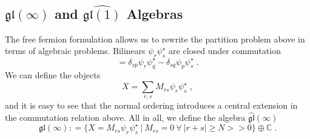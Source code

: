 

\subsection{\(\mathfrak{gl}(\infty)\) and \(\widehat{\mathfrak{gl}(1)}\) Algebras}

The free fermion formulation allows us to rewrite the partition
problem above in terms of algebraic problems. Bilinears
\(\psi_r\psi_s^\star\) are closed under commutation
\begin{equation}
[\psi_r\psi_s^\star, \psi_p\psi_q^\star]= \delta_{sp} \psi_r\psi_q^\star -  \delta_{sq} \psi_p\psi_s^\star\; .
\end{equation}
We can define the objects
\begin{equation}
X = \sum_{r,s} M_{rs}   \psi_r \psi^\star_{s}   \; ,
\end{equation}
and it is easy to see that the normal ordering introduces a central
extension in the commutation relation above.  All in all, we define
the algebra \(\widehat{\mathfrak{gl}}(\infty)\) \cite{Babelon2003}
\begin{equation}
\mathfrak{gl}(\infty): = \{X=M_{rs} \psi_r \psi^\star_{s} \ |
\ M_{rs}=0\ \forall\ |r+s|\geq N>> 0 \}\oplus \mathbb{C}\; .
\end{equation}

